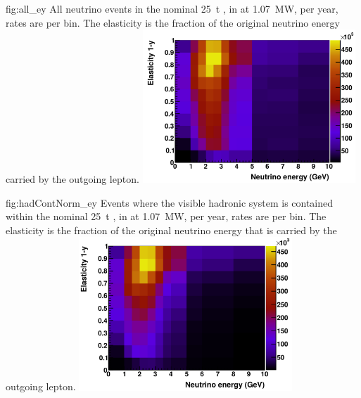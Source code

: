 \begin{dunefigure}{fig:all_ey}
{All neutrino events in the nominal \SI{25}{\tonne} , in  at \SI{1.07}{\mega\watt}, per year, rates are per bin. The elasticity is the fraction of the original neutrino energy carried by the outgoing lepton.}
	\includegraphics[width=0.6\textwidth]{graphics/all_ey.png}
\end{dunefigure}

\begin{dunefigure}{fig:hadContNorm_ey}
{Events where the visible hadronic system is contained within the nominal \SI{25}{\tonne} , in  at \SI{1.07}{\mega\watt}, per year, rates are per bin.  The elasticity is the fraction of the original neutrino energy that is carried by the outgoing lepton.}
	\includegraphics[width=0.6\textwidth]{graphics/hadContNorm_ey.png}
\end{dunefigure}

